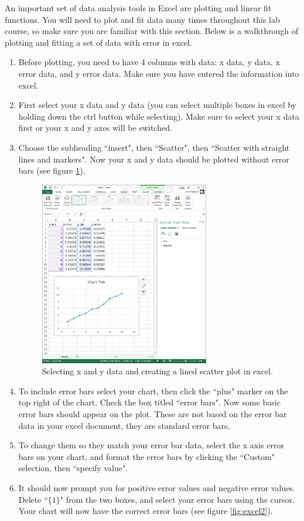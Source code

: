 An important set of data analysis tools in Excel are plotting and linear fit functions. You will need to plot and fit data many times throughout this lab course, so make sure you are familiar with this section. Below is a walkthrough of plotting and fitting a set of data with error in excel.
\begin{enumerate}
\item Before plotting, you need to have 4 columns with data: x data, y data, x error data, and y error data. Make sure you have entered the information into excel.
\item First select your x data and y data (you can select multiple boxes in excel by holding down the ctrl button while selecting). Make sure to select your x data first or your x and y axes will be switched.
\item Choose the subheading ``insert", then ``Scatter", then ``Scatter with straight lines and markers". Now your x and y data should be plotted without error bars (see figure \ref{fig:excel1}).

\begin{figure}[h!]
\centering
\includegraphics[height=0.4\textheight, width=0.7\textwidth]{./Exp1/pic/image4.png}
\caption{Selecting x and y data and creating a lined scatter plot in excel.}
\label{fig:excel1}
\end{figure}

\item To include error bars select your chart, then click the ``plus" marker on the top right of the chart. Check the box titled ``error bars". Now some basic error bars should appear on the plot. These are not based on the error bar data in your excel document, they are standard error bars.
\item To change them so they match your error bar data, select the x axis error bars on your chart, and format the error bars by clicking the ``Custom" selection, then ``specify value".
\item It should now prompt you for positive error values and negative error values. Delete ``$\{1\}$" from the two boxes, and select your error bars using the cursor. Your chart will now have the correct error bars (see figure \ref{fig:excel2}).


\end{enumerate}
